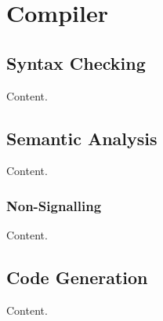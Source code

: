 \documentclass[report.tex]{subfiles}
\begin{document}

\section{Compiler} %
\label{sec:compiler}

\subsection{Syntax Checking} %
\label{sub:syntax_checking}
Content.

\subsection{Semantic Analysis} %
\label{sub:semantic_analysis}
Content.

\subsubsection{Non-Signalling} %
\label{ssub:non_signalling}
Content.

\subsection{Code Generation} %
\label{sub:code_generation}
Content.


\newpage
\end{document}
